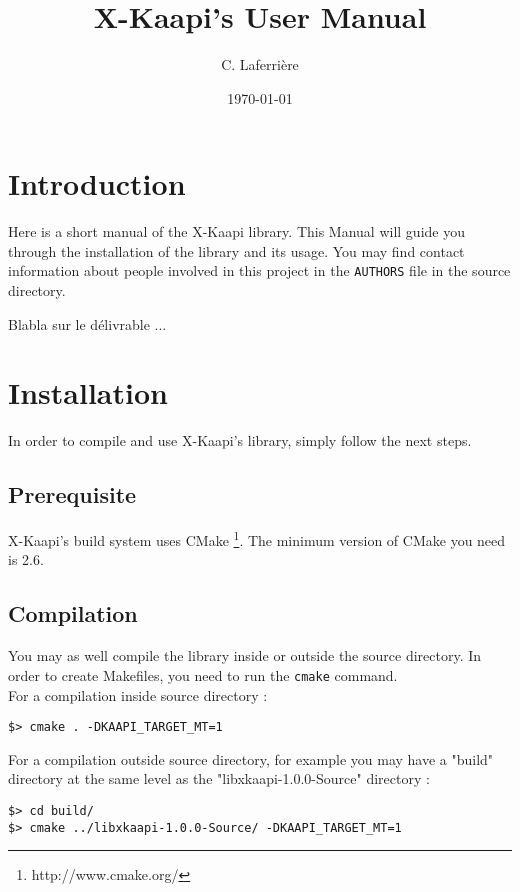 \documentclass{article}
\newcommand{\kaapi}{\textsc{X}-Kaapi\xspace}
\begin{document}
\title{X-Kaapi's User Manual}
\author{C. Laferrière}
\date{\today}
\maketitle
\newpage
\tableofcontents
\newpage
\section{Introduction}


Here is a short manual of the \kaapi library. This Manual will guide you through the installation of the library and its usage.
You may find contact information about people involved in this project in the \verb+AUTHORS+ file in the source directory.

Blabla sur le délivrable ...

\section{Installation}

In order to compile and use \kaapi's library, simply follow the next steps.

\subsection{Prerequisite}

\kaapi 's build system uses CMake \footnote{http://www.cmake.org/}. The minimum version of CMake you need is 2.6.

\subsection{Compilation}

You may as well compile the library inside or outside the source directory. In order to create Makefiles, you need to run the \verb+cmake+ command.
\\

For a compilation inside source directory :
\begin{verbatim}
$> cmake . -DKAAPI_TARGET_MT=1
\end{verbatim}


For a compilation outside source directory, for example you may have a "build" directory at the same level as the "libxkaapi-1.0.0-Source" directory :
\begin{verbatim}
$> cd build/
$> cmake ../libxkaapi-1.0.0-Source/ -DKAAPI_TARGET_MT=1
\end{verbatim}
\end{document}
